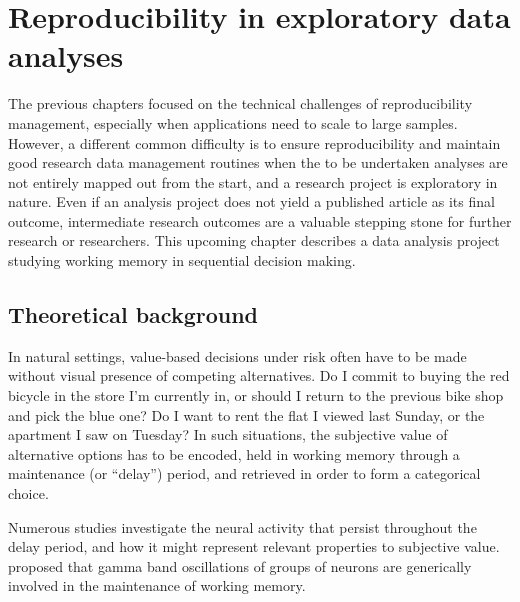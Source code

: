 

\chapter{Reproducibility in exploratory data analyses}
\label{k5}

The previous chapters focused on the technical challenges of reproducibility management, especially when applications need to scale to large samples.
However, a different common difficulty is to ensure reproducibility and maintain good research data management routines when the to be undertaken analyses are not entirely mapped out from the start, and a research project is exploratory in nature.
Even if an analysis project does not yield a published article as its final outcome, intermediate research outcomes are a valuable stepping stone for further research or researchers.
This upcoming chapter describes a data analysis project studying working memory in sequential decision making.

\section{Theoretical background}

In natural settings, value-based decisions under risk often have to be made without visual presence of competing alternatives.
Do I commit to buying the red bicycle in the store I'm currently in, or should I return to the previous bike shop and pick the blue one?
Do I want to rent the flat I viewed last Sunday, or the apartment I saw on Tuesday?
In such situations, the subjective value of alternative options has to be encoded, held in working memory through a maintenance (or ``delay'') period, and retrieved in order to form a categorical choice.

Numerous studies investigate the neural activity that persist throughout the delay period, and how it might represent relevant properties to subjective value.
\citet{roux2014working} proposed that gamma band oscillations of groups of neurons are generically involved in the maintenance of working memory.

